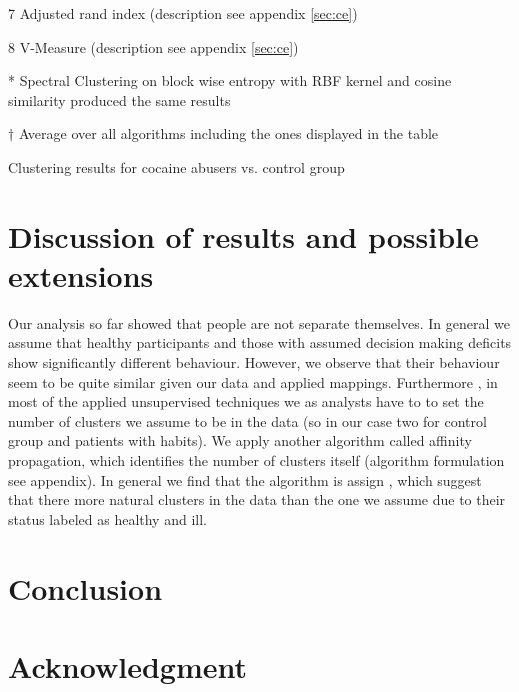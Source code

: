 \documentclass[12pt,a4paper,bibliography=totocnumbered,listof=totocnumbered]{scrartcl}
\begin{document}
{\begin{threeparttable}[H]
\begin{tcolorbox}[arc=0mm,title=Notes,boxrule=0.2mm,colbacktitle=white,coltitle=black,colback=white,top=0mm,bottom=0.1mm]
\begin{tablenotes}
	        \item[7] Adjusted rand index (description see appendix \ref{sec:ce})
	        \item[8] V-Measure (description see appendix \ref{sec:ce})
	        \item[*] Spectral Clustering on block wise entropy with RBF kernel and cosine similarity produced the same results
	        \item[$\dagger$] Average over all algorithms including the ones displayed in the table
	\end{tablenotes}
	\end{tcolorbox}
	\caption{Clustering results for cocaine abusers vs. control group} 
 \end{threeparttable} 

\section{Discussion of results and possible extensions }

Our analysis so far showed that people are not separate themselves. In general we assume that healthy participants and those with assumed decision making deficits show significantly different behaviour. However, we observe that their behaviour seem to be quite similar given our data and applied mappings. Furthermore , in most of the applied unsupervised techniques we as analysts have to to set the number of clusters we assume to be in the data (so in our case two for control group and patients with habits). We apply another algorithm called affinity propagation, which identifies the number of clusters itself (algorithm formulation see appendix). In general we find that the algorithm is assign , which suggest that there more natural clusters in the data than the  one we assume due to their status labeled as healthy and ill.


\section{Conclusion}


\section{Acknowledgment}




}
\end{document}
